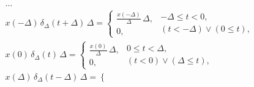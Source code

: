 \begin{equation}
        \begin{array}{c}
                        ...                                                                    \\ 
                        x\left( -\Delta \right) \, \delta _{\Delta }\left( t+\Delta \right) \, \Delta =
                                \left\{ \begin{array}{l}
                                                \frac{x\left( -\Delta \right) }{\Delta } \, \Delta ,        \\ 
                                                0,
                                        \end{array}
                                        \begin{array}{l}
                                           -\Delta \leq t<0,                                       \\ 
                                          \left( t<-\Delta \right) \vee \left( 0\leq t\right) ,
                                        \end{array}
                                \right.                                                                 \\ 
                        x\left( 0\right) \, \delta _{\Delta }\left( t\right) \, \Delta =
                                \left\{ \begin{array}{l}
                                                \frac{x\left( 0\right) }{\Delta } \, \Delta ,               \\ 
                                                0,
                                        \end{array}
                                        \begin{array}{l}
                                                0\leq t<\Delta ,                                        \\ 
                                                \left( t<0\right) \vee \left( \Delta \leq t\right) ,
                                        \end{array}
                                \right.                                                                 \\ 
                        x\left( \Delta \right) \, \delta _{\Delta }\left( t-\Delta \right) \, \Delta =
                                \left\{ \begin{array}{l}

\end{array}
\end{array}
\end{equation}
